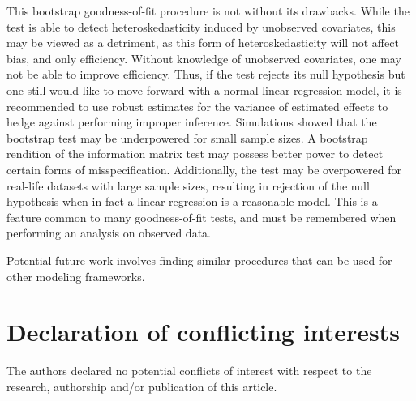 \documentclass[submit]{smj}
\begin{document}
This bootstrap goodness-of-fit procedure is not without its drawbacks. While the test is able to detect heteroskedasticity induced by unobserved covariates, this may be viewed as a detriment,
as this form of heteroskedasticity will not affect bias, and only efficiency. Without knowledge of unobserved covariates, one may not be able to improve efficiency. Thus, if the test rejects its
null hypothesis but one still would like  to move forward with a normal linear regression model, it is recommended to use robust estimates for the variance of estimated effects
to hedge against performing improper inference. Simulations showed that the bootstrap test may be underpowered for small sample sizes. A bootstrap rendition of the information matrix test may
possess better power to detect certain forms of misspecification. Additionally, the test may be overpowered for real-life datasets with large sample sizes, resulting in rejection of the null hypothesis
when in fact a linear regression is a reasonable model. This is a feature common to many goodness-of-fit tests, and must be remembered when performing an analysis on observed data.

Potential future work involves finding similar procedures that can be used for other modeling frameworks.





\section*{Declaration of conflicting interests}
The authors declared no potential conflicts of interest with respect to the research, authorship and/or
publication of this article.
\end{document}

